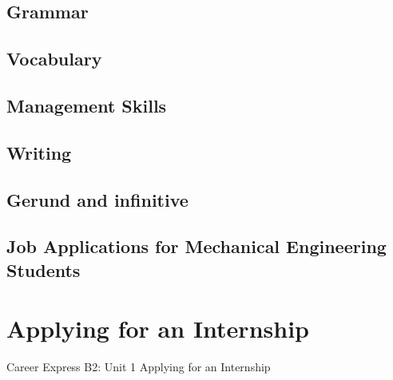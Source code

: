 \documentclass{scrreprt}
\begin{document}
\subsection{Grammar}

\subsection{Vocabulary}
\subsection{Management Skills}

\subsection{Writing}

\subsection{Gerund and infinitive}
\subsection{Job Applications for Mechanical Engineering Students}



\section{Applying for an Internship}
Career Express B2: Unit 1 Applying for an Internship





\end{document}
